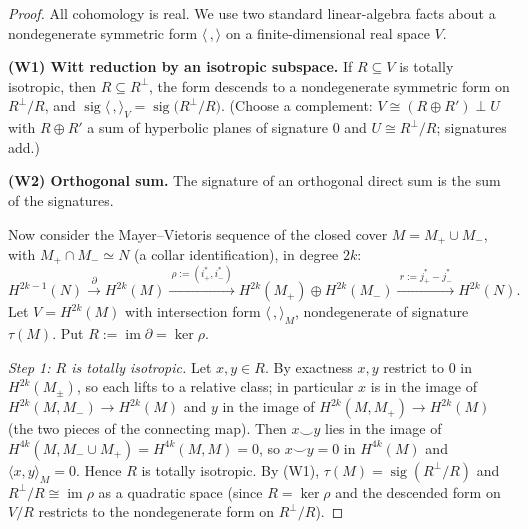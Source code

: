 \documentclass[12pt]{article}
\theoremstyle{definition}
\begin{document}
\begin{proof}
All cohomology is real. We use two standard linear-algebra facts about a nondegenerate
symmetric form $\langle\,,\rangle$ on a finite-dimensional real space $V$.

\smallskip\noindent\textbf{(W1) Witt reduction by an isotropic subspace.} If
$R\subseteq V$ is totally isotropic, then $R\subseteq R^\perp$, the form descends to a
nondegenerate symmetric form on $R^\perp/R$, and
$\operatorname{sig}\langle\,,\rangle_V=\operatorname{sig}\big(R^\perp/R\big)$. (Choose a
complement: $V\cong (R\oplus R')\perp U$ with $R\oplus R'$ a sum of hyperbolic planes of
signature $0$ and $U\cong R^\perp/R$; signatures add.)

\smallskip\noindent\textbf{(W2) Orthogonal sum.} The signature of an orthogonal direct
sum is the sum of the signatures.

\smallskip
Now consider the Mayer--Vietoris sequence of the closed cover $M=M_+\cup M_-$, with
$M_+\cap M_-\simeq N$ (a collar identification), in degree $2k$:
\[
H^{2k-1}(N)\xrightarrow{\ \partial\ }H^{2k}(M)
\xrightarrow{\ \rho:=(i_+^\ast,i_-^\ast)\ }H^{2k}(M_+)\oplus H^{2k}(M_-)
\xrightarrow{\ r:=j_+^\ast-j_-^\ast\ }H^{2k}(N).
\]
Let $V=H^{2k}(M)$ with intersection form $\langle\,,\rangle_M$, nondegenerate of signature
$\tau(M)$. Put $R:=\operatorname{im}\partial=\ker\rho$.

\emph{Step 1: $R$ is totally isotropic.} Let $x,y\in R$. By exactness $x,y$ restrict to
$0$ in $H^{2k}(M_\pm)$, so each lifts to a relative class; in particular $x$ is in the
image of $H^{2k}(M,M_-)\to H^{2k}(M)$ and $y$ in the image of $H^{2k}(M,M_+)\to H^{2k}(M)$
(the two pieces of the connecting map). Then $x\smile y$ lies in the image of
$H^{4k}(M,M_-\cup M_+)=H^{4k}(M,M)=0$, so $x\smile y=0$ in $H^{4k}(M)$ and
$\langle x,y\rangle_M=0$. Hence $R$ is totally isotropic. By (W1),
$\tau(M)=\operatorname{sig}(R^\perp/R)$ and $R^\perp/R\cong \operatorname{im}\rho$ as a
quadratic space (since $R=\ker\rho$ and the descended form on $V/R$ restricts to the
nondegenerate form on $R^\perp/R$).


\end{proof}
\end{document}
